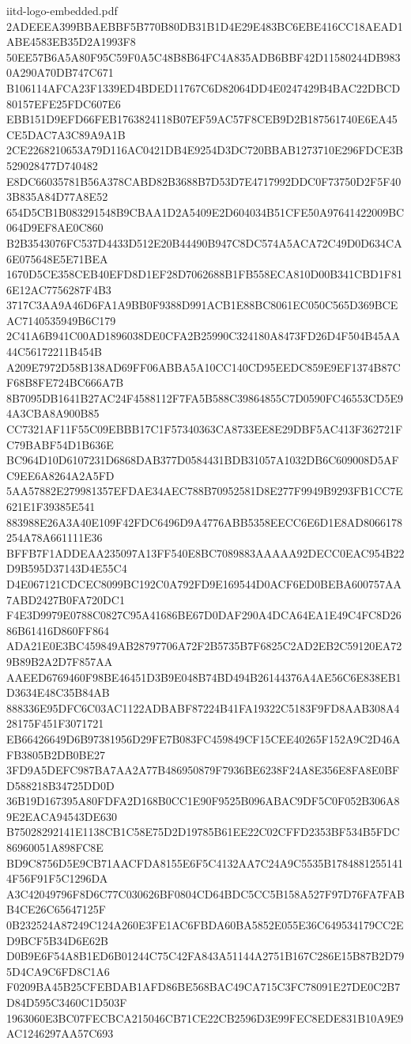 \begin{filecontents*}[overwrite]{iitd-logo-embedded.pdf}
2ADEEEA399BBAEBBF5B770B80DB31B1D4E29E483BC6EBE416CC18AEAD1ABE4583EB35D2A1993F8
50EE57B6A5A80F95C59F0A5C48B8B64FC4A835ADB6BBF42D11580244DB9830A290A70DB747C671
B106114AFCA23F1339ED4BDED11767C6D82064DD4E0247429B4BAC22DBCD80157EFE25FDC607E6
EBB151D9EFD66FEB1763824118B07EF59AC57F8CEB9D2B187561740E6EA45CE5DAC7A3C89A9A1B
2CE2268210653A79D116AC0421DB4E9254D3DC720BBAB1273710E296FDCE3B529028477D740482
E8DC66035781B56A378CABD82B3688B7D53D7E4717992DDC0F73750D2F5F403B835A84D77A8E52
654D5CB1B083291548B9CBAA1D2A5409E2D604034B51CFE50A97641422009BC064D9EF8AE0C860
B2B3543076FC537D4433D512E20B44490B947C8DC574A5ACA72C49D0D634CA6E075648E5E71BEA
1670D5CE358CEB40EFD8D1EF28D7062688B1FB558ECA810D00B341CBD1F816E12AC7756287F4B3
3717C3AA9A46D6FA1A9BB0F9388D991ACB1E88BC8061EC050C565D369BCEAC7140535949B6C179
2C41A6B941C00AD1896038DE0CFA2B25990C324180A8473FD26D4F504B45AA44C56172211B454B
A209E7972D58B138AD69FF06ABBA5A10CC140CD95EEDC859E9EF1374B87CF68B8FE724BC666A7B
8B7095DB1641B27AC24F4588112F7FA5B588C39864855C7D0590FC46553CD5E94A3CBA8A900B85
CC7321AF11F55C09EBBB17C1F57340363CA8733EE8E29DBF5AC413F362721FC79BABF54D1B636E
BC964D10D6107231D6868DAB377D0584431BDB31057A1032DB6C609008D5AFC9EE6A8264A2A5FD
5AA57882E279981357EFDAE34AEC788B70952581D8E277F9949B9293FB1CC7E621E1F39385E541
883988E26A3A40E109F42FDC6496D9A4776ABB5358EECC6E6D1E8AD8066178254A78A661111E36
BFFB7F1ADDEAA235097A13FF540E8BC7089883AAAAA92DECC0EAC954B22D9B595D37143D4E55C4
D4E067121CDCEC8099BC192C0A792FD9E169544D0ACF6ED0BEBA600757AA7ABD2427B0FA720DC1
F4E3D9979E0788C0827C95A41686BE67D0DAF290A4DCA64EA1E49C4FC8D2686B61416D860FF864
ADA21E0E3BC459849AB28797706A72F2B5735B7F6825C2AD2EB2C59120EA729B89B2A2D7F857AA
AAEED6769460F98BE46451D3B9E048B74BD494B26144376A4AE56C6E838EB1D3634E48C35B84AB
888336E95DFC6C03AC1122ADBABF87224B41FA19322C5183F9FD8AAB308A428175F451F3071721
EB66426649D6B97381956D29FE7B083FC459849CF15CEE40265F152A9C2D46AFB3805B2DB0BE27
3FD9A5DEFC987BA7AA2A77B486950879F7936BE6238F24A8E356E8FA8E0BFD588218B34725DD0D
36B19D167395A80FDFA2D168B0CC1E90F9525B096ABAC9DF5C0F052B306A89E2EACA94543DE630
B75028292141E1138CB1C58E75D2D19785B61EE22C02CFFD2353BF534B5FDC86960051A898FC8E
BD9C8756D5E9CB71AACFDA8155E6F5C4132AA7C24A9C5535B17848812551414F56F91F5C1296DA
A3C42049796F8D6C77C030626BF0804CD64BDC5CC5B158A527F97D76FA7FABB4CE26C65647125F
0B232524A87249C124A260E3FE1AC6FBDA60BA5852E055E36C649534179CC2ED9BCF5B34D6E62B
D0B9E6F54A8B1ED6B01244C75C42FA843A51144A2751B167C286E15B87B2D795D4CA9C6FD8C1A6
F0209BA45B25CFEBDAB1AFD86BE568BAC49CA715C3FC78091E27DE0C2B7D84D595C3460C1D503F
1963060E3BC07FECBCA215046CB71CE22CB2596D3E99FEC8EDE831B10A9E9AC1246297AA57C693

\end{filecontents*}
